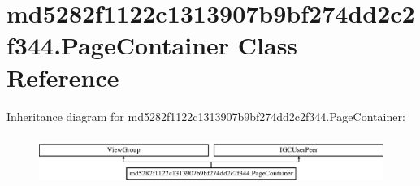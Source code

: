 \hypertarget{classmd5282f1122c1313907b9bf274dd2c2f344_1_1PageContainer}{}\section{md5282f1122c1313907b9bf274dd2c2f344.\+Page\+Container Class Reference}
\label{classmd5282f1122c1313907b9bf274dd2c2f344_1_1PageContainer}
Inheritance diagram for md5282f1122c1313907b9bf274dd2c2f344.\+Page\+Container\+:\begin{figure}[H]
\begin{center}
\leavevmode
\includegraphics[height=1.618497cm]{classmd5282f1122c1313907b9bf274dd2c2f344_1_1PageContainer}
\end{center}
\end{figure}
